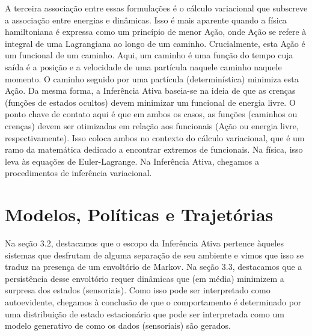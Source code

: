 \documentclass[
  12pt,
]{book}
\begin{document}
A terceira associação entre essas formulações é o cálculo variacional que subscreve a associação entre energias e dinâmicas. Isso é mais aparente quando a física hamiltoniana é expressa como um princípio de menor Ação, onde Ação se refere à integral de uma Lagrangiana ao longo de um caminho. Crucialmente, esta Ação é um funcional de um caminho. Aqui, um caminho é uma função do tempo cuja saída é a posição e a velocidade de uma partícula naquele caminho naquele momento. O caminho seguido por uma partícula (determinística) minimiza esta Ação. Da mesma forma, a Inferência Ativa baseia-se na ideia de que as crenças (funções de estados ocultos) devem minimizar um funcional de energia livre. O ponto chave de contato aqui é que em ambos os casos, as funções (caminhos ou crenças) devem ser otimizadas em relação aos funcionais (Ação ou energia livre, respectivamente). Isso coloca ambos no contexto do cálculo variacional, que é um ramo da matemática dedicado a encontrar extremos de funcionais. Na física, isso leva às equações de Euler-Lagrange. Na Inferência Ativa, chegamos a procedimentos de inferência variacional.

\hypertarget{modelos-poluxedticas-e-trajetuxf3rias}{%
\section{Modelos, Políticas e Trajetórias}\label{modelos-poluxedticas-e-trajetuxf3rias}}

Na seção 3.2, destacamos que o escopo da Inferência Ativa pertence àqueles sistemas que desfrutam de alguma separação de seu ambiente e vimos que isso se traduz na presença de um envoltório de Markov. Na seção 3.3, destacamos que a persistência desse envoltório requer dinâmicas que (em média) minimizem a surpresa dos estados (sensoriais). Como isso pode ser interpretado como autoevidente, chegamos à conclusão de que o comportamento é determinado por uma distribuição de estado estacionário que pode ser interpretada como um modelo generativo de como os dados (sensoriais) são gerados.
\end{document}
